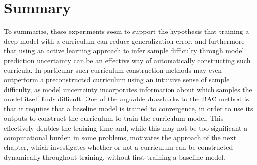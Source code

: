 \section{Summary}
To summarize, these experiments seem to support the hypothesis that training a deep model with a curriculum can reduce generalization error, and furthermore that using an active learning approach to infer sample difficulty through model prediction uncertainty can be an effective way of automatically constructing such curricula. In particular such curriculum construction methods may even outperform a preconstructed curriculum using an intuitive sense of sample difficulty, as model uncertainty incorporates information about which samples the model itself finds difficult. One of the arguable drawbacks to the BAC method is that it requires that a baseline model is trained to convergence, in order to use its outputs to construct the curriculum to train the curriculum model. This effectively doubles the training time and, while this may not be too significant a computational burden in some problems, motivates the approach of the next chapter, which investigates whether or not a curriculum can be constructed dynamically throughout training, without first training a baseline model.



